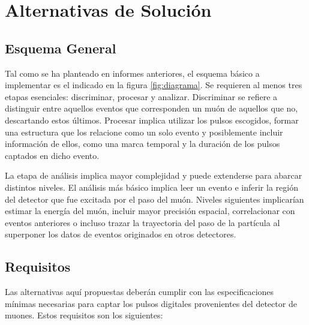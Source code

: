\section{Alternativas de Solución}
\subsection*{Esquema General}
\par Tal como se ha planteado en informes anteriores, el esquema básico a implementar es el indicado en la figura \ref{fig:diagrama}. Se requieren al menos tres etapas esenciales: discriminar, procesar y analizar. Discriminar se refiere a distinguir entre aquellos eventos que corresponden un muón de aquellos que no, descartando estos últimos. Procesar implica utilizar los pulsos escogidos, formar una estructura que los relacione como un solo evento y posiblemente incluir información de ellos, como una marca temporal y la duración de los pulsos captados en dicho evento. 
\par La etapa de análisis implica mayor complejidad y puede extenderse para abarcar distintos niveles. El análisis más básico implica leer un evento e inferir la región del detector que fue excitada por el paso del muón. Niveles siguientes implicarían estimar la energía del muón, incluir mayor precisión espacial, correlacionar con eventos anteriores o incluso trazar la trayectoria  del paso de la partícula al superponer los datos de eventos originados en otros detectores.

\newpage
\subsection*{Requisitos}
\par Las alternativas aquí propuestas deberán cumplir con las especificaciones mínimas necesarias para captar los pulsos digitales provenientes del detector de muones. Estos requisitos son los siguientes:

